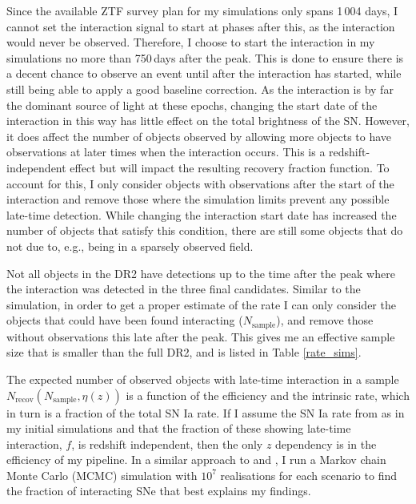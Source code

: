 \documentclass[a4paper,oneside,12pt, class=Latex/Classes/PhDthesisPSnPDF, crop=false]{standalone}
\begin{document}
Since the available ZTF survey plan for my simulations only spans 1\,004 days, I cannot set the interaction signal to start at phases after this, as the interaction would never be observed. Therefore, I choose to start the interaction in my simulations no more than 750\,days after the peak. This is done to ensure there is a decent chance to observe an event until after the interaction has started, while still being able to apply a good baseline correction. As the interaction is by far the dominant source of light at these epochs, changing the start date of the interaction in this way has little effect on the total brightness of the SN. However, it does affect the number of objects observed by allowing more objects to have observations at later times when the interaction occurs. This is a redshift-independent effect but will impact the resulting recovery fraction function. To account for this, I only consider objects with observations after the start of the interaction and remove those where the simulation limits prevent any possible late-time detection. While changing the interaction start date has increased the number of objects that satisfy this condition, there are still some objects that do not due to, e.g., being in a sparsely observed field.

Not all objects in the DR2 have detections up to the time after the peak where the interaction was detected in the three final candidates. Similar to the simulation, in order to get a proper estimate of the rate I can only consider the objects that could have been found interacting ($N_\text{sample}$), and remove those without observations this late after the peak. This gives me an effective sample size that is smaller than the full DR2, and is listed in Table \ref{rate_sims}.

The expected number of observed objects with late-time interaction in a sample $N_\text{recov}(N_\text{sample}, \eta(z))$ is a function of the efficiency and the intrinsic rate, which in turn is a fraction of the total SN Ia rate. If I assume the SN Ia rate from \citet{SNIa_rate} as in my initial simulations and that the fraction of these showing late-time interaction, $f$, is redshift independent, then the only $z$ dependency is in the efficiency of my pipeline. In a similar approach to \citet{SLSN_rate} and \citet{Ca-rich_rate}, I run a Markov chain Monte Carlo (MCMC) simulation with $10^7$ realisations for each scenario to find the fraction of interacting SNe that best explains my findings.
\end{document}
